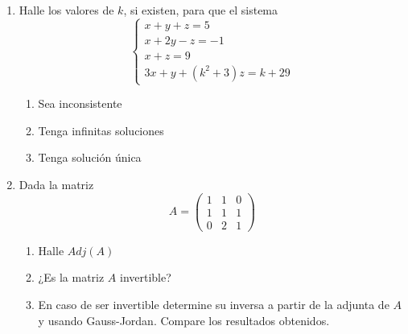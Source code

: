 \documentclass[12pt]{article}
\begin{document}
\begin{enumerate}
$$\begin{array}{rcl}
  x+y+z & = & 2\\
  x+2y+z & = & 3\\
  x+y+(a^2-3)z & = & a
  \end{array}\right.
$$
\begin{enumerate}
  \item Sea inconsistente
  \item Tenga infinitas soluciones. Halle las soluciones para este caso.
  \item Tenga solución única. Halle la solución para este caso.
\end{enumerate}
\item Halle los valores de $k$, si existen, para que el sistema
\[
\begin{cases}
x + y + z = 5 \\
x + 2y - z = -1 \\
x + z = 9 \\
3x + y + (k^2 + 3)z = k + 29
\end{cases}
\]
\begin{enumerate}
  \item Sea inconsistente
  \item Tenga infinitas soluciones
  \item Tenga solución única
\end{enumerate}
\item Dada la matriz 
$$
A = \begin{pmatrix}
  1 & 1 & 0\\
  1 & 1 & 1\\
  0 & 2 & 1
\end{pmatrix}
$$
\begin{enumerate}
  \item Halle $Adj(A)$
  \item ¿Es la matriz $A$ invertible?
  \item En caso de ser invertible determine su inversa a partir de la adjunta de $A$ y usando Gauss-Jordan. Compare los resultados obtenidos.
\end{enumerate}
\end{enumerate}
\end{document}
